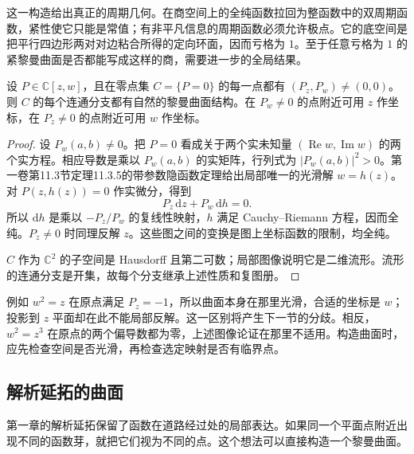 这一构造给出真正的周期几何。在商空间上的全纯函数拉回为整函数中的双周期函数，紧性使它只能是常值；有非平凡信息的周期函数必须允许极点。它的底空间是把平行四边形两对对边粘合所得的定向环面，因而亏格为 \(1\)。至于任意亏格为 \(1\) 的紧黎曼曲面是否都能写成这样的商，需要进一步的全局结果。

\begin{proposition}
	\label{g4:prop:0201:implicit-curve}
	设 \(P\in\mathbb C[z,w]\)，且在零点集 \(C=\{P=0\}\) 的每一点都有 \((P_z,P_w)\ne(0,0)\)。则 \(C\) 的每个连通分支都有自然的黎曼曲面结构。在 \(P_w\ne0\) 的点附近可用 \(z\) 作坐标，在 \(P_z\ne0\) 的点附近可用 \(w\) 作坐标。
\end{proposition}
\begin{proof}
	设 \(P_w(a,b)\ne0\)。把 \(P=0\) 看成关于两个实未知量 \((\operatorname{Re}w,\operatorname{Im}w)\) 的两个实方程。相应导数是乘以 \(P_w(a,b)\) 的实矩阵，行列式为 \(|P_w(a,b)|^2>0\)。第一卷第11.3节定理11.3.5的带参数隐函数定理给出局部唯一的光滑解 \(w=h(z)\)。对 \(P(z,h(z))=0\) 作实微分，得到
	\[
		P_z\,\mathrm{d}z+P_w\,\mathrm{d}h=0.
	\]
	所以 \(\mathrm{d}h\) 是乘以 \(-P_z/P_w\) 的复线性映射，\(h\) 满足 Cauchy--Riemann 方程，因而全纯。\(P_z\ne0\) 时同理反解 \(z\)。这些图之间的变换是图上坐标函数的限制，均全纯。

	\(C\) 作为 \(\mathbb C^2\) 的子空间是 Hausdorff 且第二可数；局部图像说明它是二维流形。流形的连通分支是开集，故每个分支继承上述性质和复图册。
\end{proof}

例如 \(w^2=z\) 在原点满足 \(P_z=-1\)，所以曲面本身在那里光滑，合适的坐标是 \(w\)；投影到 \(z\) 平面却在此不能局部反解。这一区别将产生下一节的分歧。相反，\(w^2=z^3\) 在原点的两个偏导数都为零，上述图像论证在那里不适用。构造曲面时，应先检查空间是否光滑，再检查选定映射是否有临界点。

\subsection{解析延拓的曲面}
\label{g4:subsec:0201:03}

第一章的解析延拓保留了函数在道路经过处的局部表达。如果同一个平面点附近出现不同的函数芽，就把它们视为不同的点。这个想法可以直接构造一个黎曼曲面。

